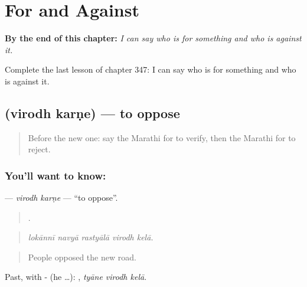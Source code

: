 
\chapter{For and Against}
\label{ch:mr-for-and-against}

\begin{chapteropening}
\textbf{By the end of this chapter:} \emph{I can say who is for something and who is against it.}

Complete the last lesson of chapter 347: I can say who is for something and who is against it.
\end{chapteropening}

\section[\texorpdfstring{\mr{विरोध} \mr{करणे} (virodh karṇe)}{विरोध करणे (virodh karṇe)}]{  (virodh karṇe) — to oppose}

\label{lesson:MR-C347-virodh-karne}



\begin{quote}
Before the new one: say the Marathi for to verify, then the Marathi for to reject.
\end{quote}

\subsection*{You'll want to know:  }
\textbf{ } — \emph{virodh karṇe} — \textquotedblleft{}to oppose\textquotedblright{}.

\begin{quote}
    .
\end{quote}

\begin{quote}
\emph{lokānnī navyā rastyālā virodh kelā.}
\end{quote}

\begin{quote}
People opposed the new road.
\end{quote}

Past, with - (he …):   , \emph{tyāne virodh kelā}.

